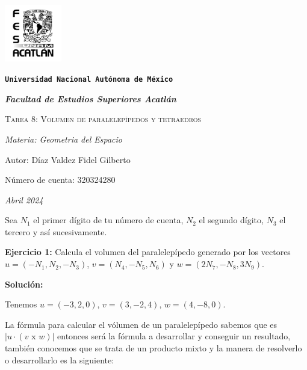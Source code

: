 \documentclass{article}
\begin{document}
\begin{titlepage}
    \centering   
    {\includegraphics[width=2.5cm]{logo.png}\par}
    {\texttt{\bfseries \LARGE Universidad Nacional Autónoma de México} \par}
    \vspace{1cm}
    {\itshape \Large \bfseries Facultad de Estudios Superiores Acatlán \par}
    \vspace{3cm}
    {\scshape \Huge Tarea 8: Volumen de paralelepípedos y tetraedros \par}
    \vspace {3cm}
    {\slshape \Large Materia: Geometria del Espacio \par}
    \vspace{2cm}
    {\Large Autor: Díaz Valdez Fidel Gilberto\par}
    {\Large Número de cuenta: 320324280\par}
    \vfill
    {\itshape Abril 2024 \par}
 \end{titlepage}

 Sea $N_1$ el primer dígito de tu número de cuenta, $N_2$ el segundo dígito, $N_3$ el tercero y así
sucesivamente.
\vspace{10pt}

\textbf{Ejercicio 1:} Calcula el volumen del paralelepípedo generado por los vectores $u = (-N_1, N_2, -N_3)$, $v = (N_4,-N_5, N_6)$ y
$w =(2N_7,-N_8,3N_9)$.
\vspace{10pt}

\textbf{Solución:}
\vspace{10pt}

Tenemos $u =(-3, 2, 0)$, $v =(3,-2, 4)$, $w =(4,-8,0)$.

La fórmula para calcular el vólumen de un paralelepípedo sabemos que es $\left| u \cdot(v\text{ x }w)\right|$ entonces será la fórmula a desarrollar y 
conseguir un resultado, también conocemos que se trata de un producto mixto y la manera de resolverlo o desarrollarlo es la siguiente:
\end{document}
